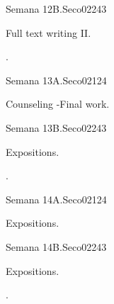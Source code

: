 \begin{syllabus}
\begin{unit}{}{Semana 12B.}{Seco02}{24}{3}
   \begin{topics}
      \item Full text writing II.
   \end{topics}

   \begin{learningoutcomes}
      \item .
      \end{learningoutcomes}
\end{unit}


\begin{unit}{}{Semana 13A.}{Seco02}{12}{4}
   \begin{topics}
      \item Counseling -Final work.
   \end{topics}
   \begin{learningoutcomes}
      \item 
   \end{learningoutcomes}
\end{unit}

\begin{unit}{}{Semana 13B.}{Seco02}{24}{3}
   \begin{topics}
      \item Expositions.
   \end{topics}

   \begin{learningoutcomes}
      \item .
      \end{learningoutcomes}
\end{unit}


\begin{unit}{}{Semana 14A.}{Seco02}{12}{4}
   \begin{topics}
      \item Expositions.
   \end{topics}
   \begin{learningoutcomes}
      \item 
   \end{learningoutcomes}
\end{unit}

\begin{unit}{}{Semana 14B.}{Seco02}{24}{3}
   \begin{topics}
      \item Expositions.
   \end{topics}

   \begin{learningoutcomes}
      \item .
      \end{learningoutcomes}
\end{unit}


\end{syllabus}
